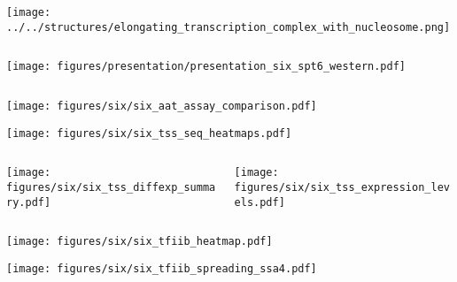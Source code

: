 \documentclass[aspectratio=169]{beamer}
\begin{document}
\begin{frame}[t,plain]
    \centerline{\texttt{[image: ../../structures/elongating\_transcription\_complex\_with\_nucleosome.png]}}
\end{frame}

\begin{frame}
    \centering
    \begin{columns}
        \begin{column}{0.5\textwidth}
            \texttt{[image: figures/presentation/presentation\_six\_spt6\_western.pdf]}
        \end{column}
        \begin{column}{0.5\textwidth}
        \end{column}
    \end{columns}
\end{frame}

\begin{frame}
    \texttt{[image: figures/six/six\_aat\_assay\_comparison.pdf]}
\end{frame}

\begin{frame}
    \texttt{[image: figures/six/six\_tss\_seq\_heatmaps.pdf]}
\end{frame}

\begin{frame}
    \centering
    \begin{columns}
        \begin{column}{0.5\textwidth}
            \texttt{[image: figures/six/six\_tss\_diffexp\_summary.pdf]}
        \end{column}
        \begin{column}{0.5\textwidth}
            \texttt{[image: figures/six/six\_tss\_expression\_levels.pdf]}
        \end{column}
    \end{columns}
\end{frame}

\begin{frame}
    \texttt{[image: figures/six/six\_tfiib\_heatmap.pdf]}
\end{frame}

\begin{frame}
    \texttt{[image: figures/six/six\_tfiib\_spreading\_ssa4.pdf]}
\end{frame}
\end{document}
